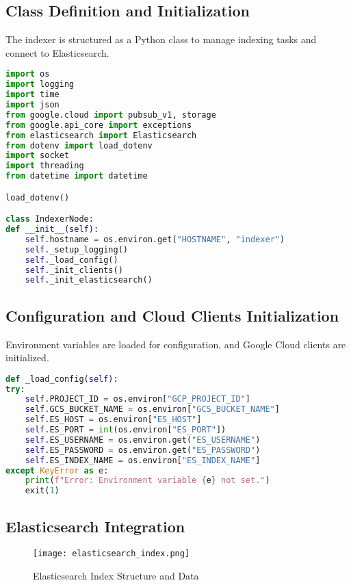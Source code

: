 \documentclass[12pt,a4paper]{report}
\begin{document}
\subsection{Class Definition and Initialization}
The indexer is structured as a Python class to manage indexing tasks and connect to Elasticsearch.
\begin{lstlisting}[language=Python]
import os
import logging
import time
import json
from google.cloud import pubsub_v1, storage
from google.api_core import exceptions
from elasticsearch import Elasticsearch
from dotenv import load_dotenv
import socket
import threading
from datetime import datetime

load_dotenv()

class IndexerNode:
def __init__(self):
    self.hostname = os.environ.get("HOSTNAME", "indexer")
    self._setup_logging()
    self._load_config()
    self._init_clients()
    self._init_elasticsearch()
\end{lstlisting}
\newpage
\subsection{Configuration and Cloud Clients Initialization}
Environment variables are loaded for configuration, and Google Cloud clients are initialized.
\begin{lstlisting}[language=Python]
def _load_config(self):
try:
    self.PROJECT_ID = os.environ["GCP_PROJECT_ID"]
    self.GCS_BUCKET_NAME = os.environ["GCS_BUCKET_NAME"]
    self.ES_HOST = os.environ["ES_HOST"]
    self.ES_PORT = int(os.environ["ES_PORT"])
    self.ES_USERNAME = os.environ.get("ES_USERNAME")
    self.ES_PASSWORD = os.environ.get("ES_PASSWORD")
    self.ES_INDEX_NAME = os.environ["ES_INDEX_NAME"]
except KeyError as e:
    print(f"Error: Environment variable {e} not set.")
    exit(1)
\end{lstlisting}

\subsection{Elasticsearch Integration}
\begin{figure}[htb!]
    \centering
    \texttt{[image: elasticsearch\_index.png]}
    \caption{Elasticsearch Index Structure and Data}
    \label{fig:elasticsearch-index}
\end{figure}
\end{document}
